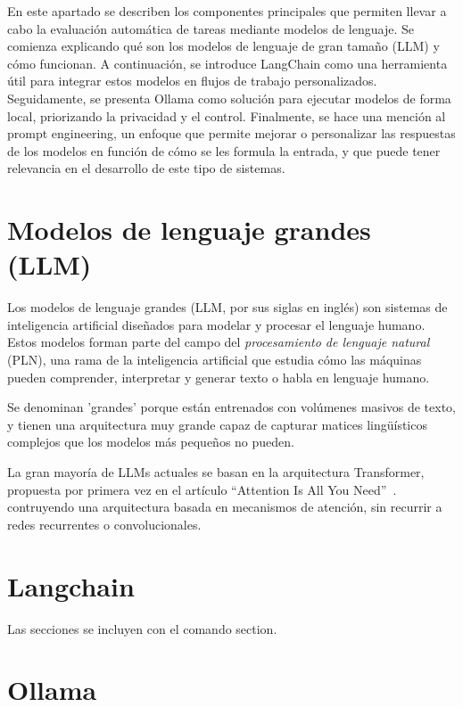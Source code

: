 
En este apartado se describen los componentes principales que permiten llevar 
a cabo la evaluación automática de tareas mediante modelos de lenguaje. 
Se comienza explicando qué son los modelos de lenguaje de gran tamaño (LLM) 
y cómo funcionan. A continuación, se introduce LangChain como una herramienta 
útil para integrar estos modelos en flujos de trabajo personalizados. 
Seguidamente, se presenta Ollama como solución para ejecutar modelos de forma 
local, priorizando la privacidad y el control. Finalmente, se hace una mención 
al prompt engineering, un enfoque que permite mejorar o personalizar las 
respuestas de los modelos en función de cómo se les formula la entrada, y 
que puede tener relevancia en el desarrollo de este tipo de sistemas.

\section{Modelos de lenguaje grandes (LLM)}

Los modelos de lenguaje grandes (LLM, por sus siglas en inglés) son sistemas de 
inteligencia artificial diseñados para modelar y procesar el lenguaje humano. 
Estos modelos forman parte del campo del \textit{procesamiento de lenguaje natural} (PLN), 
una rama de la inteligencia artificial que estudia cómo las máquinas pueden comprender, 
interpretar y generar texto o habla en lenguaje humano.

Se denominan 'grandes' porque están entrenados con volúmenes 
masivos de texto, y tienen una arquitectura muy grande capaz de capturar matices 
lingüísticos complejos que los modelos más pequeños no pueden.

La gran mayoría de LLMs actuales se basan en la arquitectura Transformer, propuesta por 
primera vez en el artículo ``Attention Is All You Need''~\cite{vaswani2017}. 
contruyendo una arquitectura basada en mecanismos de atención, sin recurrir a 
redes recurrentes o convolucionales.



\section{Langchain }

Las secciones se incluyen con el comando section.

\section{Ollama}


